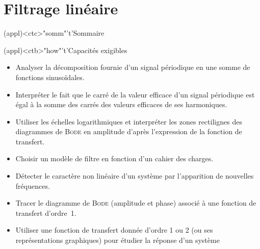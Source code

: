\documentclass[../../main/main.tex]{subfiles}
\begin{document}
\setcounter{chapter}{7}


\chapter{Filtrage lin\'eaire}

\vspace*{\fill}

\begin{tcn}(appl)<ctc>"somm"'t'{Sommaire}
	\let\item\olditem
	\vspace{-15pt}
	\minitoc
	\vspace{-25pt}
\end{tcn}

\begin{tcn}[sidebyside,
  fontupper=\footnotesize, fontlower=\footnotesize
  ](appl)<ctb>"how"'t'{Capacités exigibles}
	\begin{itemize}[label=\rcheck]
		\item Analyser la décomposition fournie d'un signal périodique en une
		      somme de fonctions sinusoïdales.
		\item Interpréter le fait que le carré de la valeur efficace d'un signal
		      périodique est égal à la somme des carrés des valeurs efficaces de
		      ses harmoniques.
		\item Utiliser les échelles logarithmiques et interpréter les zones
		      rectilignes des diagrammes de \textsc{Bode} en amplitude d'après
		      l'expression de la fonction de transfert.
		\item Choisir un modèle de filtre en fonction d'un cahier des charges.
		\item Détecter le caractère non linéaire d'un système par l'apparition de
		      nouvelles fréquences.
	\end{itemize}
	\tcblower
	\begin{itemize}[label=\rcheck]
		\item Tracer le diagramme de \textsc{Bode} (amplitude et phase)
		      associé à une fonction de transfert d'ordre~1.
		\item Utiliser une fonction de transfert donnée d'ordre 1 ou 2 (ou ses
		      représentations graphiques) pour étudier la réponse d'un système

\end{itemize}
\end{tcn}
\end{document}
